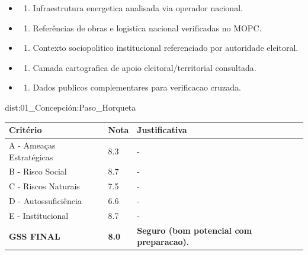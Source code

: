 {\begin{itemize}
\item
  \begin{enumerate}
  \def\labelenumi{\arabic{enumi})}
  \setcounter{enumi}{7}
  \tightlist
  \item
    Infraestrutura energetica analisada via operador nacional.
  \end{enumerate}
\item
  \begin{enumerate}
  \def\labelenumi{\arabic{enumi})}
  \setcounter{enumi}{8}
  \tightlist
  \item
    Referências de obras e logistica nacional verificadas no MOPC.
  \end{enumerate}
\item
  \begin{enumerate}
  \def\labelenumi{\arabic{enumi})}
  \setcounter{enumi}{9}
  \tightlist
  \item
    Contexto sociopolitico institucional referenciado por autoridade
    eleitoral.
  \end{enumerate}
\item
  \begin{enumerate}
  \def\labelenumi{\arabic{enumi})}
  \setcounter{enumi}{10}
  \tightlist
  \item
    Camada cartografica de apoio eleitoral/\allowbreak \allowbreak territorial consultada.
  \end{enumerate}
\item
  \begin{enumerate}
  \def\labelenumi{\arabic{enumi})}
  \setcounter{enumi}{11}
  \tightlist
  \item
    Dados publicos complementares para verificacao cruzada.
  \end{enumerate}
\end{itemize}}{dist:01_Concepción:Paso_Horqueta}
\begin{table}[ht!]
\small \begin{tabular}{p{3.0cm}p{0.8cm}p{6.0cm}} \toprule
\textbf{Critério} & \textbf{Nota} & \textbf{Justificativa} \\ \midrule
A - Ameaças Estratégicas & 8.3 & - \\
B - Risco Social & 8.7 & - \\
C - Riscos Naturais & 7.5 & - \\
D - Autossuficiência & 6.6 & - \\
E - Institucional & 8.7 & - \\
\midrule \textbf{GSS FINAL} & \textbf{8.0} & \textbf{Seguro (bom potencial com preparacao).} \\ \bottomrule \end{tabular}
\end{table}
